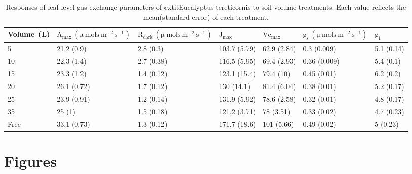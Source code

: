 \documentclass[a4paper]{article}\usepackage[]{graphicx}\usepackage[]{color}
\begin{document}
\begin{table}
\centering
\caption{Responses of leaf level gas exchange parameters of 	extit{Eucalyptus tereticornis} to soil volume treatments. Each value reflects the mean(standard error) of each treatment.} 
\label{table:Table2}
\begin{tabular}{lllllll}
  \hline
	{Volume~(L)} & $\mathrm{A_{max}~(\mu~mols~m^{-2}~s^{-1})}$ & $\mathrm{R_{dark}~(\mu~mols~m^{-2}~s^{-1})}$ & $\mathrm{J_{max}}$ & $\mathrm{Vc_{max}}$ & $\mathrm{g_s~(\mu~mols~m^{-2}~s^{-1})}$ & $\mathrm{g_1}$ \\ 
  \hline
5 & 21.2 (0.9) & 2.8 (0.3) & 103.7 (5.79) & 62.9 (2.84) & 0.3 (0.009) & 5.1 (0.14) \\ 
  10 & 22.3 (1.4) & 2.7 (0.38) & 116.5 (5.95) & 69.4 (2.93) & 0.36 (0.009) & 5.4 (0.1) \\ 
  15 & 23.3 (1.2) & 1.4 (0.12) & 123.1 (15.4) & 79.4 (10) & 0.45 (0.01) & 6.2 (0.2) \\ 
  20 & 26.1 (0.72) & 1.7 (0.12) & 130 (14.1) & 81.4 (6.04) & 0.38 (0.01) & 5.2 (0.17) \\ 
  25 & 23.9 (0.91) & 1.2 (0.14) & 131.9 (5.92) & 78.6 (2.58) & 0.32 (0.01) & 4.8 (0.17) \\ 
  35 & 25 (1) & 1.5 (0.18) & 121.2 (3.71) & 78 (3.51) & 0.33 (0.02) & 4.7 (0.23) \\ 
  Free & 33.1 (0.73) & 1.3 (0.12) & 171.7 (18.6) & 101 (5.66) & 0.49 (0.02) & 5 (0.23) \\ 
   \hline
\end{tabular}
\end{table}




% 
% 




\clearpage
\section*{Figures}
\end{document}

